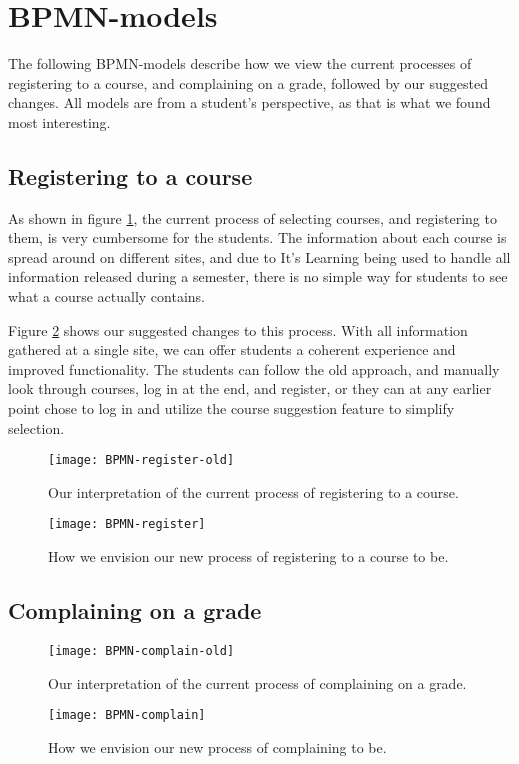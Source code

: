 \section{BPMN-models}
	The following BPMN-models\cite{bpmn} describe how we view the current processes of registering to a course, and complaining on a grade, followed by our suggested changes.
All models are from a student's perspective, as that is what we found most interesting.

\subsection{Registering to a course}
	As shown in figure \ref{fig:Register-old}, the current process of selecting courses, and registering to them, is very cumbersome for the students.
The information about each course is spread around on different sites, and due to It's Learning being used to handle all information released during a semester,
there is no simple way for students to see what a course actually contains.

Figure \ref{fig:Register-new} shows our suggested changes to this process.
With all information gathered at a single site, we can offer students a coherent experience and improved functionality.
The students can follow the old approach, and manually look through courses, log in at the end, and register,
or they can at any earlier point chose to log in and utilize the course suggestion feature to simplify selection.
\begin{figure}[H]
    \centering
    \texttt{[image: BPMN-register-old]}%
    \caption{Our interpretation of the current process of registering to a course.}
    \label{fig:Register-old}
\end{figure}

\begin{figure}[H]
    \centering
    \texttt{[image: BPMN-register]}
    \caption{How we envision our new process of registering to a course to be.}
    \label{fig:Register-new}
\end{figure}

\subsection{Complaining on a grade}
	

\begin{figure}[H]
    \centering
    \texttt{[image: BPMN-complain-old]}
    \caption{Our interpretation of the current process of complaining on a grade.}
    \label{fig:Complain-old}
\end{figure}

\begin{figure}[H]
    \centering
    \texttt{[image: BPMN-complain]}
    \caption{How we envision our new process of complaining to be.}
    \label{fig:Complain-new}
\end{figure}
